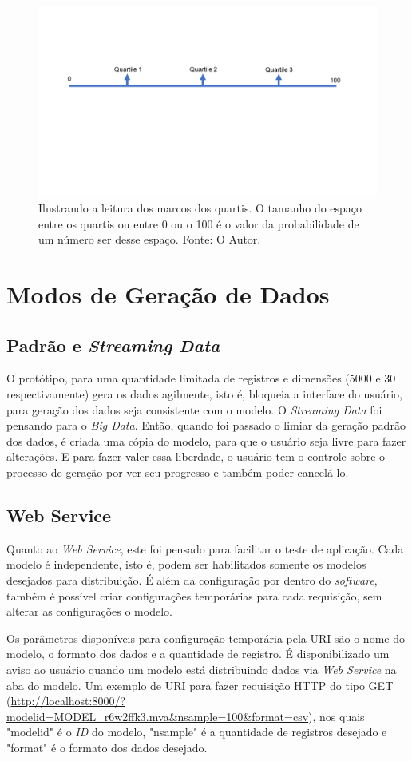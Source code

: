 \documentclass[
	12pt,				%
	openright,			%
	twoside,			%
	a4paper,			%
	english,			%
	brazil				%
	]{abntex2}
\begin{document}
			\begin{figure}[h]
				\centering
				\includegraphics[width=\linewidth]{./figures/prototipo/quartil.png}
				\caption{Ilustrando a leitura dos marcos dos quartis. O tamanho do espaço entre os quartis ou entre 0 ou o 100 é o valor da probabilidade de um número ser desse espaço. Fonte: O Autor.}
				\label{fig:leituraMarco}
			\end{figure}
	\section{Modos de Geração de Dados}

		\subsection{Padrão e \emph{Streaming Data}}
			O protótipo, para uma quantidade limitada de registros e dimensões (5000 e 30 respectivamente) gera os dados agilmente, isto é, bloqueia a interface do usuário, para geração dos dados seja consistente com o modelo.
			O \emph{Streaming Data} foi pensando para o \emph{Big Data}. Então, quando foi passado o limiar da geração padrão dos dados, é criada uma cópia do modelo, para que o usuário seja livre para fazer alterações.
			E para fazer valer essa liberdade, o usuário tem o controle sobre o processo de geração por ver seu progresso e também poder cancelá-lo.
		\subsection{Web Service}
			Quanto ao \emph{Web Service}, este foi pensado para facilitar o teste de aplicação.
			Cada modelo é independente, isto é, podem ser habilitados somente os modelos desejados para distribuição.
			É além da configuração por dentro do \emph{software}, também é possível criar configurações temporárias para cada requisição, sem alterar as configurações o modelo.
			\par
			Os parâmetros disponíveis para configuração temporária pela URI são o nome do modelo, o formato dos dados e a quantidade de registro.
			É disponibilizado um aviso ao usuário quando um modelo está distribuindo dados via \emph{Web Service} na aba do modelo.
			Um exemplo de URI para fazer requisição HTTP do tipo GET (\url{http://localhost:8000/?modelid=MODEL_r6w2ffk3.mva&nsample=100&format=csv}), nos quais "modelid" é o \emph{ID} do modelo, "nsample" é a quantidade de registros desejado e "format" é o formato dos dados desejado.
	 
\end{document}

